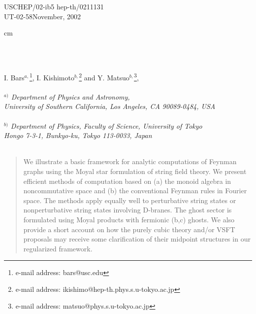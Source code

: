 \documentclass[a4paper,11pt]{article}
\begin{document}
\begin{titlepage}
\thispagestyle{empty}
\begin{flushleft}
USCHEP/02-ib5
\hfill hep-th/0211131 \\
UT-02-58\hfill November, 2002 \\
\end{flushleft}

 cm
\bigskip

\begin{center}
\\
\noindent{
 }\\
\renewcommand{\thefootnote}{\fnsymbol{footnote}}

\vskip 2cm
{\large
I. Bars$^{a,}$\footnote{e-mail address: bars@usc.edu},
I. Kishimoto$^{b,}$\footnote{e-mail address:
 ikishimo@hep-th.phys.s.u-tokyo.ac.jp} and
Y. Matsuo$^{b,}$\footnote{e-mail address:
 matsuo@phys.s.u-tokyo.ac.jp}, } \\
{\it
\noindent{ \bigskip }\\
$^{a)}$ Department of Physics and Astronomy,\\
University of Southern California, Los Angeles, CA 90089-0484, USA \\
\noindent{\smallskip  }\\
$^{b)}$ Department of Physics, Faculty of Science, University of Tokyo \\
Hongo 7-3-1, Bunkyo-ku, Tokyo 113-0033, Japan\\
\noindent{ \smallskip }\\
}
\bigskip
\end{center}
\begin{abstract}
We illustrate a basic framework for analytic computations of
Feynman graphs using the Moyal star formulation of string field
theory. We present efficient methods of computation based on (a)
the monoid algebra in noncommutative space and (b) the
conventional Feynman rules in Fourier space. The methods apply
equally well to perturbative string states or nonperturbative
string states involving D-branes. The ghost sector is formulated
using Moyal products with fermionic (b,c) ghosts. We also provide
a short account on how the purely cubic theory and/or VSFT
proposals may receive some clarification of their midpoint
structures in our regularized framework.
\end{abstract}
\vfill
\end{titlepage}\vfill\setcounter{footnote}{0} \renewcommand{\thefootnote}{%
\arabic{footnote}} \newpage
\end{document}
